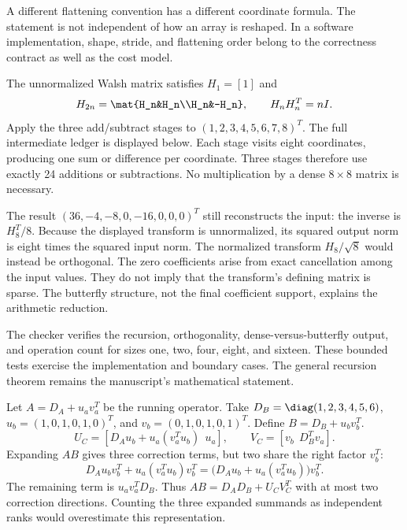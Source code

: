 A different flattening convention has a different coordinate formula. The statement is not independent of how an array is reshaped. In a software implementation, shape, stride, and flattening order belong to the correctness contract as well as the cost model.

The unnormalized Walsh matrix satisfies $H_1=[1]$ and
\[
H_{2n}=\mat{H_n&H_n\\H_n&-H_n},\qquad H_nH_n^T=nI.
\]
Apply the three add/subtract stages to $(1,2,3,4,5,6,7,8)^T$. The full intermediate ledger is displayed below.
Each stage visits eight coordinates, producing one sum or difference per coordinate. Three stages therefore use exactly 24 additions or subtractions. No multiplication by a dense $8\times8$ matrix is necessary.

The result $(36,-4,-8,0,-16,0,0,0)^T$ still reconstructs the input: the inverse is $H_8^T/8$. Because the displayed transform is unnormalized, its squared output norm is eight times the squared input norm. The normalized transform $H_8/\sqrt8$ would instead be orthogonal.
The zero coefficients arise from exact cancellation among the input values. They do not imply that the transform's defining matrix is sparse. The butterfly structure, not the final coefficient support, explains the arithmetic reduction.

The checker verifies the recursion, orthogonality, dense-versus-butterfly output, and operation count for sizes one, two, four, eight, and sixteen. These bounded tests exercise the implementation and boundary cases. The general recursion theorem remains the manuscript's mathematical statement.

Let $A=D_A+u_av_a^T$ be the running operator. Take $D_B=\diag(1,2,3,4,5,6)$, $u_b=(1,0,1,0,1,0)^T$, and $v_b=(0,1,0,1,0,1)^T$. Define $B=D_B+u_bv_b^T$.
\[
U_C=[D_Au_b+u_a(v_a^Tu_b)\ \ u_a],\qquad
V_C=[v_b\ \ D_B^Tv_a].
\]
Expanding $AB$ gives three correction terms, but two share the right factor $v_b^T$:
\[
D_Au_bv_b^T+u_a(v_a^Tu_b)v_b^T
=\bigl(D_Au_b+u_a(v_a^Tu_b)\bigr)v_b^T.
\]
The remaining term is $u_av_a^TD_B$. Thus $AB=D_AD_B+U_CV_C^T$ with at most two correction directions. Counting the three expanded summands as independent ranks would overestimate this representation.

